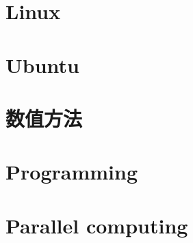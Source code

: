 \documentclass[a4paper,11pt,twoside]{book}
\begin{document}
\part{Linux}





\part{Ubuntu}


\part{数值方法}


\part{Programming}



\part{Parallel computing}

\end{document}
